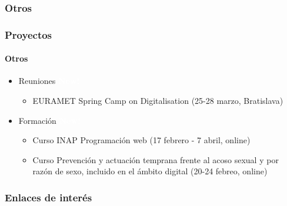 \documentclass{beamer}
\newcommand{\highlight}[1]{{\color{blue} #1}}
\newcommand{\new}{{\colorbox{blue!30}{\textcolor{white}{\textbf{\scriptsize New!}}}}}
\begin{document}
	\subsubsection{Otros}

	\begin{frame}
		\frametitle{Proyectos}
		\framesubtitle{Otros}
		\begin{itemize}
			\item \highlight{Reuniones} \new
			\begin{itemize}
				\item EURAMET Spring Camp on Digitalisation (25-28 marzo, Bratislava)
			\end{itemize}
			\item \highlight{Formación} \new
			\begin{itemize}
				\item Curso INAP Programación web (17 febrero - 7 abril, online)
				\item Curso Prevención y actuación temprana frente al acoso sexual y por razón de sexo, incluido en el ámbito digital (20-24 febreo, online)
			\end{itemize}
		\end{itemize}
	\end{frame}

	\subsubsection{Enlaces de interés}
	
\end{document}
